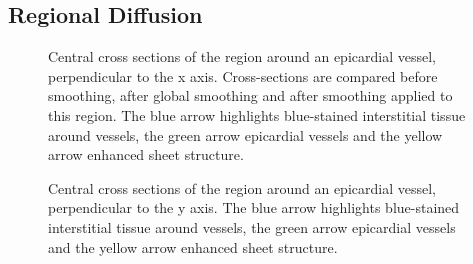   \subsection{Regional Diffusion} %
  \label{sub:regional_diffusion}
    \begin{figure}[p]
      \centering
      \caption{Central cross sections of the region around an epicardial vessel, perpendicular to the x axis. Cross-sections are compared before smoothing, after global smoothing and after smoothing applied to this region. The blue arrow highlights blue-stained interstitial tissue around vessels, the green arrow epicardial vessels and the yellow arrow enhanced sheet structure.}
      \label{fig:vessel_cross_section_x}
    \end{figure}
    
    \begin{figure}[p]
      \centering
      \caption{Central cross sections of the region around an epicardial vessel, perpendicular to the y axis.  The blue arrow highlights blue-stained interstitial tissue around vessels, the green arrow epicardial vessels and the yellow arrow enhanced sheet structure.}
      \label{fig:vessel_cross_section_y}
    \end{figure}
    
